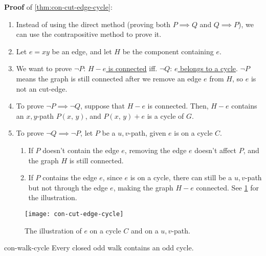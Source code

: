 \documentclass[../src/handouts/main.tex]{subfiles}
\begin{document}
\textbf{Proof} of \cref{thm:con-cut-edge-cycle}:
\begin{enumerate}
  \item Instead of using the direct method (proving both $P \implies Q$ and $Q \implies P$), we can use the contrapositive method to prove it.
  \item Let $e = xy$ be an edge, and let $H$ be the component containing $e$.
  \item We want to prove $\neg P$: \underline{$H - e$ is connected} iff. $\neg Q$: \underline{$e$ belongs to a cycle}. $\neg P$ means the graph is still connected after we remove an edge $e$ from $H$, so $e$ is not an cut-edge.
  \item To prove $\neg P \implies \neg Q$, suppose that $H - e$ is connected. Then, $H - e$ contains an $x,y$-path $P(x,\, y)$, and $P(x,\, y) + e$ is a cycle of $G$.
  \item To prove $\neg Q \implies \neg P$, let $P$ be a $u,v$-path, given $e$ is on a cycle $C$.
    \begin{enumerate}
      \item If $P$ doesn't contain the edge $e$, removing the edge $e$ doesn't affect $P$, and the graph $H$ is still connected.
      \item If $P$ contains the edge $e$, since $e$ is on a cycle, there can still be a $u,v$-path but not through the edge $e$, making the graph $H-e$ connected. See \cref{fig:con-cut-edge-cycle} for the illustration.
    \end{enumerate}
\end{enumerate}

\begin{figure}[htbp]
  \centering
  \texttt{[image: con-cut-edge-cycle]}
  \caption{The illustration of $e$ on a cycle $C$ and on a $u,v$-path.}
  \label{fig:con-cut-edge-cycle}
\end{figure}

\begin{lemma}{}{con-walk-cycle}
  Every closed odd walk contains an odd cycle.
\end{lemma}
\end{document}
